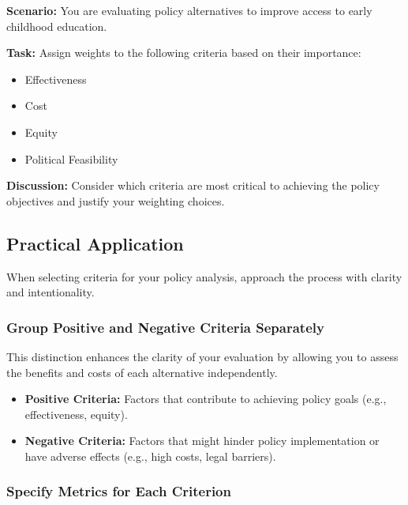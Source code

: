 \documentclass{article}
\theoremstyle{definition}
\theoremstyle{plain}
\begin{document}
\begin{tcolorbox}[colback=yellow!5!white, colframe=yellow!75!black, title=Exercise: Weighting Criteria]

\textbf{Scenario:} You are evaluating policy alternatives to improve access to early childhood education.

\textbf{Task:} Assign weights to the following criteria based on their importance:

\begin{itemize}
    \item Effectiveness
    \item Cost
    \item Equity
    \item Political Feasibility
\end{itemize}

\textbf{Discussion:} Consider which criteria are most critical to achieving the policy objectives and justify your weighting choices.

\end{tcolorbox}

\subsection{Practical Application}

When selecting criteria for your policy analysis, approach the process with clarity and intentionality.

\subsubsection{Group Positive and Negative Criteria Separately}

This distinction enhances the clarity of your evaluation by allowing you to assess the benefits and costs of each alternative independently.

\begin{itemize}
    \item \textbf{Positive Criteria:} Factors that contribute to achieving policy goals (e.g., effectiveness, equity).

    \item \textbf{Negative Criteria:} Factors that might hinder policy implementation or have adverse effects (e.g., high costs, legal barriers).
\end{itemize}

\subsubsection{Specify Metrics for Each Criterion}
\end{document}
